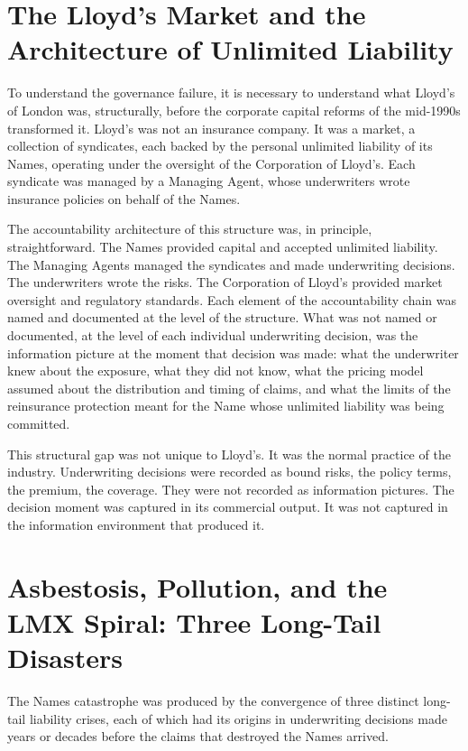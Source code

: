 \scenebreak

\section{The Lloyd's Market and the Architecture of Unlimited Liability}

To understand the governance failure, it is necessary to understand what Lloyd's of London was, structurally, before the corporate capital reforms of the mid-1990s transformed it. Lloyd's was not an insurance company. It was a market, a collection of syndicates, each backed by the personal unlimited liability of its Names, operating under the oversight of the Corporation of Lloyd's. Each syndicate was managed by a Managing Agent, whose underwriters wrote insurance policies on behalf of the Names.

The accountability architecture of this structure was, in principle, straightforward. The Names provided capital and accepted unlimited liability. The Managing Agents managed the syndicates and made underwriting decisions. The underwriters wrote the risks. The Corporation of Lloyd's provided market oversight and regulatory standards. Each element of the accountability chain was named and documented at the level of the structure. What was not named or documented, at the level of each individual underwriting decision, was the information picture at the moment that decision was made: what the underwriter knew about the exposure, what they did not know, what the pricing model assumed about the distribution and timing of claims, and what the limits of the reinsurance protection meant for the Name whose unlimited liability was being committed.

This structural gap was not unique to Lloyd's. It was the normal practice of the industry. Underwriting decisions were recorded as bound risks, the policy terms, the premium, the coverage. They were not recorded as information pictures. The decision moment was captured in its commercial output. It was not captured in the information environment that produced it.

\scenebreak

\section{Asbestosis, Pollution, and the LMX Spiral: Three Long-Tail Disasters}

The Names catastrophe was produced by the convergence of three distinct long-tail liability crises, each of which had its origins in underwriting decisions made years or decades before the claims that destroyed the Names arrived.

